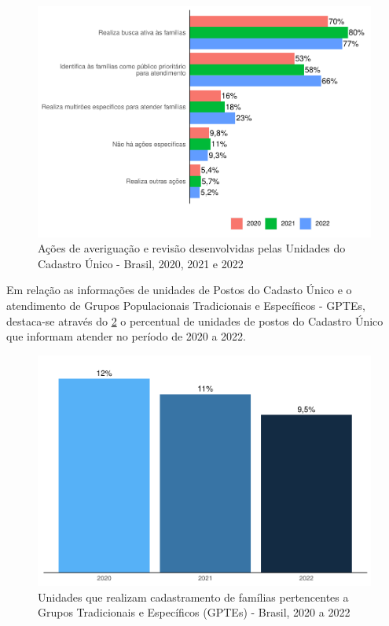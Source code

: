 \documentclass[
  brazilian]{report}
\begin{document}
\begin{figure}
\includegraphics{Censo-SUAS-2022_files/figure-latex/ave_cad-1} \caption[Ações de averiguação e revisão desenvolvidas pelas Unidades do Cadastro Único - Brasil, 2020, 2021 e 2022]{Ações de averiguação e revisão desenvolvidas pelas Unidades do Cadastro Único - Brasil, 2020, 2021 e 2022}\label{fig:ave_cad}
\end{figure}

Em relação as informações de unidades de Postos do Cadasto Único e o
atendimento de Grupos Populacionais Tradicionais e Específicos - GPTEs,
destaca-se através do \cref{fig:gptes-cadunico} o percentual de unidades
de postos do Cadastro Único que informam atender no período de 2020 a
2022.

\begin{figure}
\includegraphics{Censo-SUAS-2022_files/figure-latex/gptes-cadunico-1} \caption[Unidades que realizam cadastramento de famílias pertencentes a Grupos Tradicionais e Específicos (GPTEs) - Brasil, 2020 a 2022]{Unidades que realizam cadastramento de famílias pertencentes a Grupos Tradicionais e Específicos (GPTEs) - Brasil, 2020 a 2022}\label{fig:gptes-cadunico}
\end{figure}
\end{document}
